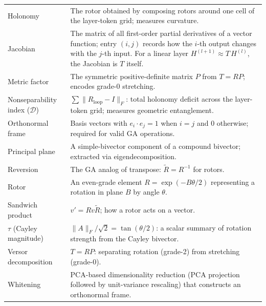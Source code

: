 \documentclass[11pt, twoside, openright]{memoir}
\newcommand{\ip}{\cdot}           %
\newcommand{\rev}[1]{\widetilde{#1}} %
\numberwithin{equation}{chapter}
\begin{document}
\begin{center}
\begin{tabular}{@{}L{4cm} L{7.5cm}@{}}
Holonomy &
  The rotor obtained by composing rotors around one cell of the layer-token grid; measures
  curvature. \\
Jacobian &
  The matrix of all first-order partial derivatives of a vector
  function; entry $(i,j)$ records how the $i$-th output changes with
  the $j$-th input.  For a linear layer $H^{(l+1)} \approx T\,H^{(l)}$,
  the Jacobian is $T$ itself. \\
Metric factor &
  The symmetric positive-definite matrix $P$ from $T = RP$; encodes
  grade-0 stretching. \\
Nonseparability index ($\mathcal{D}$) &
  $\sum \|R_{\text{loop}} - I\|_F$: total holonomy deficit across the
  layer-token grid; measures geometric entanglement. \\
Orthonormal frame &
  Basis vectors with $e_i \ip e_j = 1$ when $i=j$ and $0$ otherwise; required for valid GA
  operations. \\
Principal plane &
  A simple-bivector component of a compound bivector; extracted via
  eigendecomposition. \\
Reversion &
  The GA analog of transpose: $\rev{R} = R^{-1}$ for rotors. \\
Rotor &
  An even-grade element $R = \exp(-B\theta/2)$ representing a rotation
  in plane $B$ by angle $\theta$. \\
Sandwich product &
  $v' = R v \rev{R}$; how a rotor acts on a vector. \\
$\tau$ (Cayley magnitude) &
  $\|A\|_F / \sqrt{2} = \tan(\theta/2)$: a scalar summary of rotation
  strength from the Cayley bivector. \\
Versor decomposition &
  $T = RP$: separating rotation (grade-2) from stretching (grade-0). \\
Whitening &
  PCA-based dimensionality reduction (PCA projection followed by unit-variance rescaling) that constructs an orthonormal frame. \\
\bottomrule
\end{tabular}
\end{center}
\end{document}
